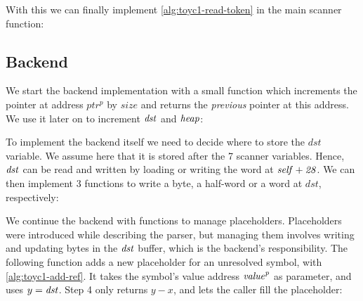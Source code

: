 With this we can finally implement \cref{alg:toyc1-read-token} in the main
scanner function:


\subsection{Backend}

We start the backend implementation with a small function which increments the
pointer at address $ptr^p$ by $size$ and returns the {\em previous} pointer at
this address. We use it later on to increment $\it{dst}$ and $\it{heap}$:


To implement the backend itself we need to decide where to store the $dst$
variable. We assume here that it is stored after the 7 scanner variables. Hence,
$\it{dst}$ can be read and written by loading or writing the word at
$\it{self}+28$. We can then implement 3 functions to write a byte, a half-word
or a word at $dst$, respectively:


We continue the backend with functions to manage placeholders. Placeholders
were introduced while describing the parser, but managing them involves writing
and updating bytes in the $\it{dst}$ buffer, which is the backend's
responsibility. The following function adds a new placeholder for an unresolved
symbol, with \cref{alg:toyc1-add-ref}. It takes the symbol's value address
$\it{value}^p$ as parameter, and uses $y=\it{dst}$. Step 4 only returns $y-x$,
and lets the caller fill the placeholder:


